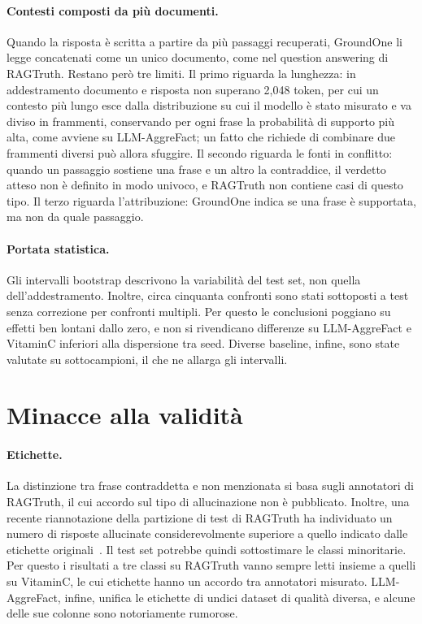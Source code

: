 \paragraph{Contesti composti da più documenti.} Quando la risposta è scritta a partire da più passaggi recuperati,
GroundOne li legge concatenati come un unico documento, come nel question answering di RAGTruth. Restano però tre
limiti. Il primo riguarda la lunghezza: in addestramento documento e risposta non superano 2{,}048 token, per cui un
contesto più lungo esce dalla distribuzione su cui il modello è stato misurato e va diviso in frammenti, conservando
per ogni frase la probabilità di supporto più alta, come avviene su LLM-AggreFact; un fatto che richiede di combinare
due frammenti diversi può allora sfuggire. Il secondo riguarda le fonti in conflitto: quando un passaggio sostiene una
frase e un altro la contraddice, il verdetto atteso non è definito in modo univoco, e RAGTruth non contiene casi di
questo tipo. Il terzo riguarda l'attribuzione: GroundOne indica se una frase è supportata, ma non da quale passaggio.

\paragraph{Portata statistica.} Gli intervalli bootstrap descrivono la variabilità del test set, non quella
dell'addestramento. Inoltre, circa cinquanta confronti sono stati sottoposti a test senza correzione per confronti
multipli. Per questo le conclusioni poggiano su effetti ben lontani dallo zero, e non si rivendicano differenze su
LLM-AggreFact e VitaminC inferiori alla dispersione tra seed. Diverse baseline, infine, sono state valutate su
sottocampioni, il che ne allarga gli intervalli.

\section{Minacce alla validità}
\label{sec:disc-threats}

\paragraph{Etichette.} La distinzione tra frase contraddetta e non menzionata si basa sugli annotatori di RAGTruth, il
cui accordo sul tipo di allucinazione non è pubblicato. Inoltre, una recente riannotazione della partizione di test di
RAGTruth ha individuato un numero di risposte allucinate considerevolmente superiore a quello indicato dalle etichette
originali~\cite{yu2026retromorphic}. Il test set potrebbe quindi sottostimare le classi minoritarie. Per questo i
risultati a tre classi su RAGTruth vanno sempre letti insieme a quelli su VitaminC, le cui etichette hanno un accordo tra
annotatori misurato. LLM-AggreFact, infine, unifica le etichette di undici dataset di qualità diversa, e alcune delle sue
colonne sono notoriamente rumorose.

